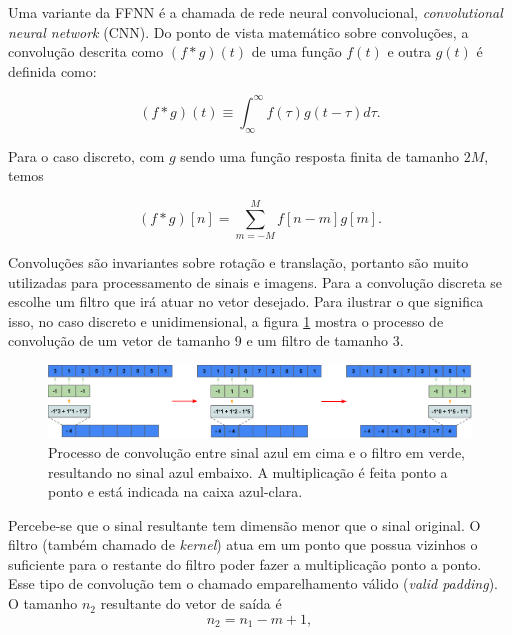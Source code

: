 \documentclass[a4paper,12pt,oneside]{book}
\begin{document}
\par Uma variante da FFNN é a chamada de rede neural convolucional, \textit{convolutional neural network} (CNN). Do ponto de vista matemático sobre convoluções, a convolução descrita como $(f*g)(t)$ de uma função $f(t)$ e outra $g(t)$ é definida como:

\begin{equation}\label{eq:conv_cont}
    (f*g)(t) \equiv \int^{\infty}_{\infty} f(\tau)g(t - \tau)d\tau.
\end{equation}

Para o caso discreto, com $g$ sendo uma função resposta finita de tamanho $2M$, temos

\begin{equation}\label{eq:conv_disc}
    (f*g)[n] = \sum^{M}_{m = -M} f[n - m]g[m]. 
\end{equation}

\par Convoluções são invariantes sobre rotação e translação, portanto são muito utilizadas para processamento de sinais e imagens\cite{signal_book}. Para a convolução discreta se escolhe um filtro que irá atuar no vetor desejado. Para ilustrar o que significa isso, no caso discreto e unidimensional, a figura \ref{fig:conv_valid} mostra o processo de convolução de um vetor de tamanho 9 e um filtro de tamanho 3.

\begin{figure}[H]
    \centering
    \includegraphics[scale = 0.38]{figs/conv_valid.png}
    \caption{Processo de convolução entre sinal azul em cima e o filtro em verde, resultando no sinal azul embaixo. A multiplicação é feita ponto a ponto e está indicada na caixa azul-clara.}
    \label{fig:conv_valid}
\end{figure}

\par Percebe-se que o sinal resultante tem dimensão menor que o sinal original. O filtro (também chamado de \textit{kernel}) atua em um ponto que possua vizinhos o suficiente para o restante do filtro poder fazer a multiplicação ponto a ponto. Esse tipo de convolução tem o chamado emparelhamento válido (\textit{valid padding}). O tamanho $n_2$ resultante do vetor de saída é 
\begin{equation}
    n_2 = n_1 - m + 1,
\end{equation}
\end{document}

